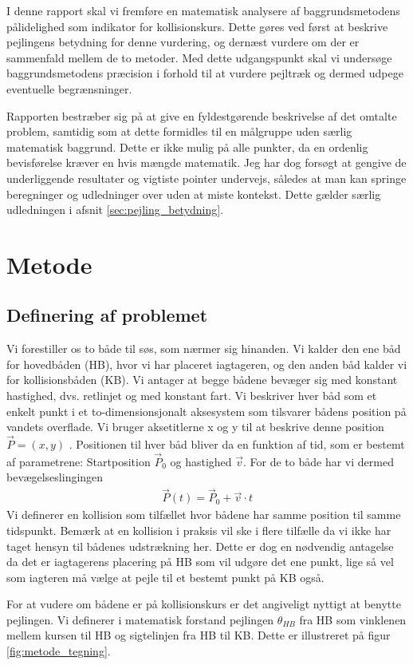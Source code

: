 \documentclass[%
 reprint,
nofootinbib,
aps,
]{revtex4-1}
\begin{document}
I denne rapport skal vi fremføre en matematisk analysere af baggrundsmetodens pålidelighed som indikator for kollisionskurs. Dette gøres ved først at beskrive pejlingens betydning for denne vurdering, og dernæst vurdere om der er sammenfald mellem de to metoder. Med dette udgangspunkt skal vi undersøge baggrundsmetodens præcision i forhold til at vurdere pejltræk og dermed udpege eventuelle begrænsninger.\par
Rapporten bestræber sig på at give en fyldestgørende beskrivelse af det omtalte problem, samtidig som at dette formidles til en målgruppe uden særlig matematisk baggrund. Dette er ikke mulig på alle punkter, da en ordenlig bevisførelse kræver en hvis mængde matematik. Jeg har dog forsøgt at gengive de underliggende resultater og vigtiste pointer undervejs, således at man kan springe beregninger og udledninger over uden at miste kontekst. Dette gælder særlig udledningen i afsnit \ref{sec:pejling_betydning}.


\section{Metode}
\subsection{Definering af problemet}
Vi forestiller os to både til søs, som nærmer sig hinanden. Vi kalder den ene båd for hovedbåden (HB), hvor vi har placeret iagtageren, og den anden båd kalder vi for kollisionsbåden (KB). Vi antager at begge bådene bevæger sig med konstant hastighed, dvs. retlinjet og med konstant fart. Vi beskriver hver båd som et enkelt punkt i et to-dimensionsjonalt aksesystem som tilsvarer bådens position på vandets overflade. Vi bruger aksetitlerne x og y til at beskrive denne position $\vec{P} = (x, y)$ . Positionen til hver båd bliver da en funktion af tid, som er bestemt af parametrene: Startposition $\vec{P}_0$ og hastighed $\vec{v}$. For de to både har vi dermed bevægelseslingingen
\begin{align}
  \vec{P}(t) =  \vec{P}_0 + \vec{v}\cdot t
  \label{eq:motion}
\end{align}
Vi definerer en kollision som tilfællet hvor bådene har samme position til samme tidspunkt. Bemærk at en kollision i praksis vil ske i flere tilfælle da vi ikke har taget hensyn til bådenes udstrækning her. Dette er dog en nødvendig antagelse da det er iagtagerens placering på HB som vil udgøre det ene punkt, lige så vel som iagteren må vælge at pejle til et bestemt punkt på KB også. \par
For at vudere om bådene er på kollisionskurs er det angiveligt nyttigt at benytte pejlingen. Vi definerer i matematisk forstand pejlingen $\theta_{HB}$ fra HB som vinklenen mellem kursen til HB og sigtelinjen fra HB til KB. Dette er illustreret på figur \ref{fig:metode_tegning}.
\end{document}
